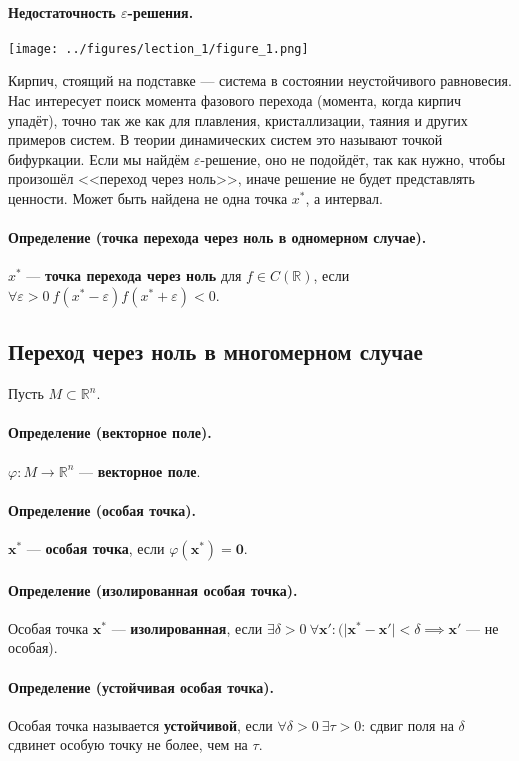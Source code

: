 \paragraph{Недостаточность $\varepsilon$-решения.}
\begin{center}
	\texttt{[image: ../figures/lection\_1/figure\_1.png]}
\end{center}
Кирпич, стоящий на подставке --- система в состоянии неустойчивого равновесия. Нас интересует поиск момента фазового перехода (момента, когда кирпич упадёт), точно так же как для плавления, кристаллизации, таяния и других примеров систем. В теории динамических систем это называют точкой бифуркации. Если мы найдём $\varepsilon$-решение, оно не подойдёт, так как нужно, чтобы произошёл <<переход через ноль>>, иначе решение не будет представлять ценности. Может быть найдена не одна точка $x^*$, а интервал.
\paragraph{Определение (точка перехода через ноль в одномерном случае).} $x^*$ --- \textbf{точка перехода через ноль} для $f\in C(\mathbb{R})$, если $\forall \varepsilon > 0 \  f(x^*-\varepsilon)f(x^*+\varepsilon) < 0$.
\subsection{Переход через ноль в многомерном случае}
Пусть $M \subset \mathbb{R}^n$.
\paragraph{Определение (векторное поле).} $\varphi:M\rightarrow\mathbb{R}^n$ --- \textbf{векторное поле}.
\paragraph{Определение (особая точка).} $\mathbf{x}^*$ --- \textbf{особая точка}, если $\varphi(\mathbf{x}^*)=\mathbf{0}$.
\paragraph{Определение (изолированная особая точка).} Особая точка $\mathbf{x}^*$ --- \textbf{изолированная}, если $\exists \delta > 0 \  \forall \mathbf{x'}: (\vert\mathbf{x}^*-\mathbf{x'}\vert<\delta \implies \mathbf{x'}$ --- не особая).
\paragraph{Определение (устойчивая особая точка).} Особая точка называется \textbf{устойчивой}, если $\forall \delta > 0 \ \exists \tau > 0$: сдвиг поля на $\delta$ сдвинет особую точку не более, чем на $\tau$.
\\

